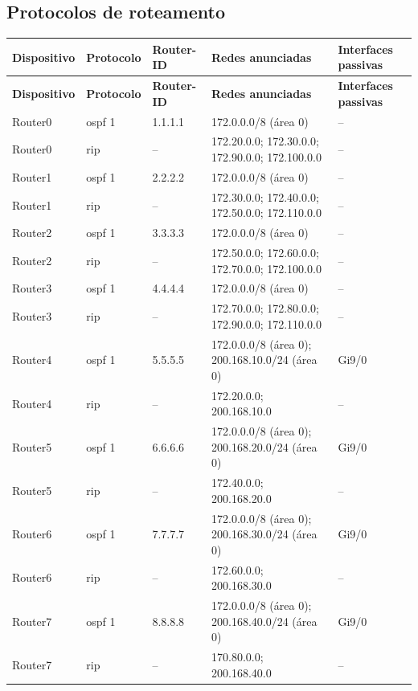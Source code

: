 \subsection{Protocolos de roteamento}
\begingroup\scriptsize\setlength{\tabcolsep}{3pt}
\begin{longtable}{@{}p{}p{}p{}p{}p{}@{}}
\toprule \textbf{Dispositivo} & \textbf{Protocolo} & \textbf{Router-ID} & \textbf{Redes anunciadas} & \textbf{Interfaces passivas} \\\midrule\endfirsthead
\toprule \textbf{Dispositivo} & \textbf{Protocolo} & \textbf{Router-ID} & \textbf{Redes anunciadas} & \textbf{Interfaces passivas} \\\midrule\endhead
Router0 & ospf 1 & 1.1.1.1 & 172.0.0.0/8 (área 0) & -- \\
Router0 & rip & -- & 172.20.0.0; 172.30.0.0; 172.90.0.0; 172.100.0.0 & -- \\
Router1 & ospf 1 & 2.2.2.2 & 172.0.0.0/8 (área 0) & -- \\
Router1 & rip & -- & 172.30.0.0; 172.40.0.0; 172.50.0.0; 172.110.0.0 & -- \\
Router2 & ospf 1 & 3.3.3.3 & 172.0.0.0/8 (área 0) & -- \\
Router2 & rip & -- & 172.50.0.0; 172.60.0.0; 172.70.0.0; 172.100.0.0 & -- \\
Router3 & ospf 1 & 4.4.4.4 & 172.0.0.0/8 (área 0) & -- \\
Router3 & rip & -- & 172.70.0.0; 172.80.0.0; 172.90.0.0; 172.110.0.0 & -- \\
Router4 & ospf 1 & 5.5.5.5 & 172.0.0.0/8 (área 0); 200.168.10.0/24 (área 0) & Gi9/0 \\
Router4 & rip & -- & 172.20.0.0; 200.168.10.0 & -- \\
Router5 & ospf 1 & 6.6.6.6 & 172.0.0.0/8 (área 0); 200.168.20.0/24 (área 0) & Gi9/0 \\
Router5 & rip & -- & 172.40.0.0; 200.168.20.0 & -- \\
Router6 & ospf 1 & 7.7.7.7 & 172.0.0.0/8 (área 0); 200.168.30.0/24 (área 0) & Gi9/0 \\
Router6 & rip & -- & 172.60.0.0; 200.168.30.0 & -- \\
Router7 & ospf 1 & 8.8.8.8 & 172.0.0.0/8 (área 0); 200.168.40.0/24 (área 0) & Gi9/0 \\
Router7 & rip & -- & 170.80.0.0; 200.168.40.0 & -- \\
\bottomrule
\end{longtable}\endgroup

